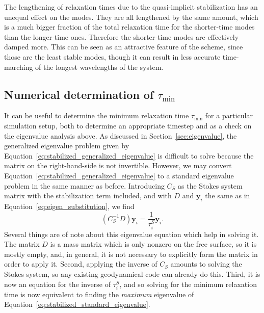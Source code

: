 \documentclass[preprint,12pt,authoryear]{elsarticle}
\begin{document}
The lengthening of relaxation times due to the quasi-implicit stabilization has an unequal 
effect on the modes. They are all lengthened by the same amount, which is a much bigger 
fraction of the total relaxation time for the shorter-time modes than the longer-time ones.
Therefore the shorter-time modes are effectively damped more.
This can be seen as an attractive feature of the scheme, since those are the least stable modes,
though it can result in less accurate time-marching of the longest wavelengths of the system.

\subsection{Numerical determination of $\tau_\mathrm{min}$}
\label{sec:numerical_determination}

It can be useful to determine the minimum relaxation time $\tau_{\mathrm{min}}$ for a particular
simulation setup, both to determine an appropriate timestep and as a check on the eigenvalue
analysis above. As discussed in Section~\ref{sec:eigenvalue}, the generalized eigenvalue problem
given by Equation~\eqref{eq:stabilized_generalized_eigenvalue} is difficult to solve because the matrix on
the right-hand-side is not invertible.
However, we may convert Equation~\eqref{eq:stabilized_generalized_eigenvalue} to a standard eigenvalue problem
in the same manner as before. Introducing $C_S$ as the Stokes system matrix with the stabilization term
included, and with $D$ and $\mathbf{y}_i$ the same as in Equation~\eqref{eq:eigen_substitution}, we find
\begin{equation}
(C_S^{-1}D)\mathbf{y}_i = \frac{1}{\tau^S_i} \mathbf{y}_i.
\label{eq:stabilized_standard_eigenvalue}
\end{equation}
Several things are of note about this eigenvalue equation which help in solving it.
The matrix $D$ is a mass matrix which is only nonzero on the free surface,
so it is mostly empty, and, in general, it is not necessary to explicitly form the
matrix in order to apply it.
Second, applying the inverse of $C_S$ amounts to solving the Stokes system, so any
existing geodynamical code can already do this.
Third, it is now an equation for the inverse of $\tau^S_i$, and so solving for the 
minimum relaxation time is now equivalent to finding the \emph{maximum} eigenvalue
of Equation~\eqref{eq:stabilized_standard_eigenvalue}.
\end{document}
